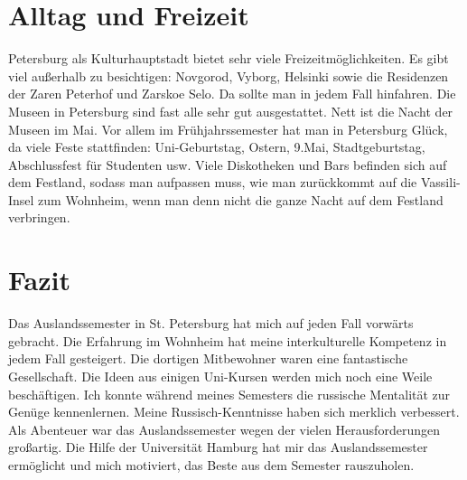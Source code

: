 \documentclass[a4paper]{scrartcl}
\begin{document}
\section*{Alltag und Freizeit}
Petersburg als Kulturhauptstadt bietet sehr viele Freizeitmöglichkeiten. Es gibt viel außerhalb zu besichtigen: Novgorod, Vyborg, Helsinki sowie die Residenzen der Zaren Peterhof und Zarskoe Selo. Da sollte man in jedem Fall hinfahren. Die Museen in Petersburg sind fast alle sehr gut ausgestattet. Nett ist die Nacht der Museen im Mai. Vor allem im Frühjahrssemester hat man in Petersburg Glück, da viele Feste stattfinden: Uni-Geburtstag, Ostern, 9.Mai, Stadtgeburtstag, Abschlussfest für Studenten usw. Viele Diskotheken und Bars befinden sich auf dem Festland, sodass man aufpassen muss, wie man zurückkommt auf die Vassili-Insel zum Wohnheim, wenn man denn nicht die ganze Nacht auf dem Festland verbringen.
\section*{Fazit}
Das Auslandssemester in St. Petersburg hat mich auf jeden Fall vorwärts gebracht. Die Erfahrung im Wohnheim hat meine interkulturelle Kompetenz in jedem Fall gesteigert. Die dortigen Mitbewohner waren eine fantastische Gesellschaft. Die Ideen aus einigen Uni-Kursen werden mich noch eine Weile beschäftigen. Ich konnte während meines Semesters die russische Mentalität zur Genüge kennenlernen. Meine Russisch-Kenntnisse haben sich merklich verbessert. Als Abenteuer war das Auslandssemester wegen der vielen Herausforderungen großartig. Die Hilfe der Universität Hamburg hat mir das Auslandssemester ermöglicht und mich motiviert, das Beste aus dem Semester rauszuholen.
\end{document}
